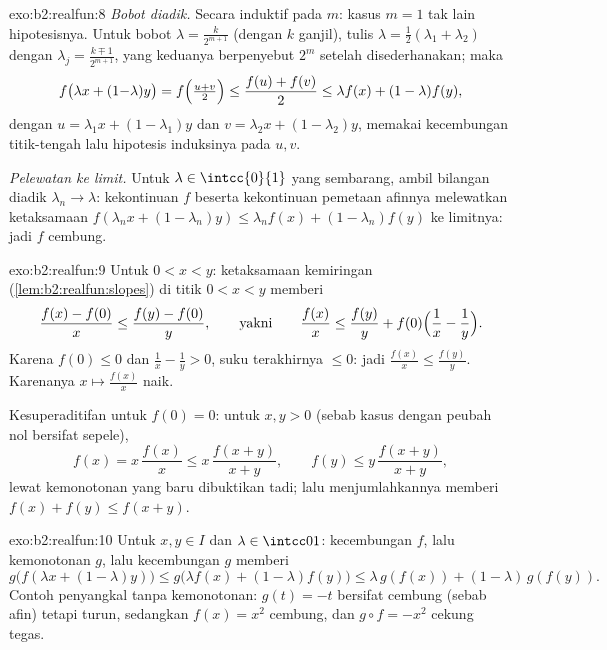 \begin{solution}{exo:b2:realfun:8}
\emph{Bobot diadik.} Secara induktif pada $m$: kasus $m = 1$ tak lain
hipotesisnya. Untuk bobot $\lambda = \frac{k}{2^{m+1}}$ (dengan $k$
ganjil), tulis $\lambda = \frac12(\lambda_1 + \lambda_2)$ dengan
$\lambda_j = \frac{k \mp 1}{2^{m+1}}$, yang keduanya berpenyebut $2^m$
setelah disederhanakan; maka
\[
f\bigl(\lambda x + (1{-}\lambda)y\bigr)
= f\Bigl(\tfrac{u + v}{2}\Bigr)
\leq \frac{f(u) + f(v)}{2}
\leq \lambda f(x) + (1 - \lambda) f(y),
\]
dengan $u = \lambda_1 x + (1 - \lambda_1)y$ dan $v = \lambda_2 x +
(1-\lambda_2)y$, memakai kecembungan titik-tengah lalu hipotesis
induksinya pada $u, v$.

\emph{Pelewatan ke limit.} Untuk $\lambda \in \intcc{0}{1}$ yang
sembarang, ambil bilangan diadik $\lambda_n \to \lambda$: kekontinuan
$f$ beserta kekontinuan pemetaan afinnya melewatkan ketaksamaan
$f(\lambda_n x + (1-\lambda_n)y) \leq \lambda_n f(x) +
(1-\lambda_n)f(y)$ ke limitnya: jadi $f$ cembung.
\end{solution}

\begin{solution}{exo:b2:realfun:9}
Untuk $0 < x < y$: ketaksamaan kemiringan
(\cref{lem:b2:realfun:slopes}) di titik $0 < x < y$ memberi
\[
\frac{f(x) - f(0)}{x} \leq \frac{f(y) - f(0)}{y},
\qquad\text{yakni}\qquad
\frac{f(x)}{x} \leq \frac{f(y)}{y} +
f(0)\Bigl(\frac1x - \frac1y\Bigr).
\]
Karena $f(0) \leq 0$ dan $\frac1x - \frac1y > 0$, suku terakhirnya
$\leq 0$: jadi $\frac{f(x)}{x} \leq \frac{f(y)}{y}$. Karenanya $x
\mapsto \frac{f(x)}x$ naik.

Kesuperaditifan untuk $f(0) = 0$: untuk $x, y > 0$ (sebab kasus dengan
peubah nol bersifat sepele),
\[
f(x) = x\,\frac{f(x)}{x} \leq x\,\frac{f(x+y)}{x+y},
\qquad
f(y) \leq y\,\frac{f(x+y)}{x+y},
\]
lewat kemonotonan yang baru dibuktikan tadi; lalu menjumlahkannya
memberi $f(x) + f(y) \leq f(x+y)$.
\end{solution}

\begin{solution}{exo:b2:realfun:10}
Untuk $x, y \in I$ dan $\lambda \in \intcc01$: kecembungan $f$,
lalu kemonotonan $g$, lalu kecembungan $g$ memberi
\[
g\bigl(f(\lambda x + (1{-}\lambda)y)\bigr)
\leq g\bigl(\lambda f(x) + (1{-}\lambda)f(y)\bigr)
\leq \lambda\,g(f(x)) + (1{-}\lambda)\,g(f(y)).
\]
Contoh penyangkal tanpa kemonotonan: $g(t) = -t$ bersifat cembung
(sebab afin) tetapi turun, sedangkan $f(x) = x^2$ cembung, dan $g \circ
f = -x^2$ cekung tegas.
\end{solution}

